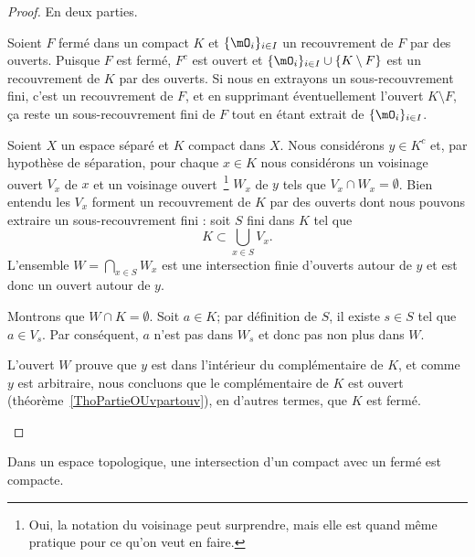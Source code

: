 \begin{proof}
	En deux parties.
	\begin{subproof}
		Soient \( F\) fermé dans un compact \( K\) et \( \{ \mO_i \}_{i\in I}\) un recouvrement de \( F\) par des ouverts. Puisque \( F\) est fermé, \( F^c\) est ouvert et \( \{ \mO_i \}_{i\in I}\cup\{ K\setminus F \}\) est un recouvrement de \( K\) par des ouverts. Si nous en extrayons un sous-recouvrement fini, c'est un recouvrement de \( F\), et en supprimant éventuellement l'ouvert \( K\setminus F\), ça reste un sous-recouvrement fini de \( F\) tout en étant extrait de \( \{ \mO_i \}_{i\in I}\).

		Soient \( X\) un espace séparé et \( K\) compact dans \( X\). Nous considérons \( y \in K^c\) et, par hypothèse de séparation, pour chaque \( x\in K\) nous considérons un voisinage ouvert \( V_x\) de \( x\) et un voisinage ouvert~\footnote{Oui, la notation du voisinage peut surprendre, mais elle est quand même pratique pour ce qu'on veut en faire.} \( W_x\) de \( y\) tels que \( V_x\cap W_x=\emptyset\). Bien entendu les \( V_x\) forment un recouvrement de \( K\) par des ouverts dont nous pouvons extraire un sous-recouvrement fini : soit \( S\) fini dans \( K\) tel que
		\begin{equation}
			K\subset\bigcup_{x\in S}V_x.
		\end{equation}
		L'ensemble \( W=\bigcap_{x\in S}W_x\) est une intersection finie d'ouverts autour de \( y\) et est donc un ouvert autour de \( y\).

		Montrons que \( W\cap K=\emptyset\). Soit \( a\in K\); par définition de \( S\), il existe \( s\in S\) tel que \( a\in V_s\). Par conséquent, \( a\) n'est pas dans \( W_s\) et donc pas non plus dans \( W\).

		L'ouvert \( W\) prouve que \( y\) est dans l'intérieur du complémentaire de \( K\), et comme \( y \) est arbitraire, nous concluons que le complémentaire de \( K\) est ouvert (théorème~\ref{ThoPartieOUvpartouv}), en d'autres termes, que \( K\) est fermé.
	\end{subproof}
\end{proof}


\begin{corollary}		\label{CORooSSFFooNkNmlS}
	Dans un espace topologique, une intersection d'un compact avec un fermé est compacte.
\end{corollary}


